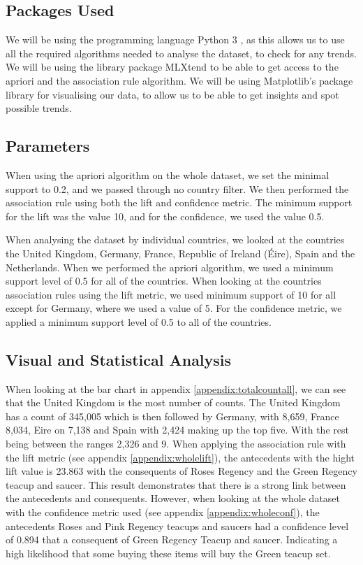 \documentclass[a4paper,10pt]{article}
\begin{document}

\subsection{Packages Used}

We will be using the programming language Python 3 \cite{Python}, as this allows us to use all the required algorithms needed to analyse the dataset, to check for any trends. We will be using the library package MLXtend\cite{raschkas_2018_mlxtend} to be able to get access to the apriori and the association rule algorithm. We will be using Matplotlib's \cite{hunter2007matplotlib} package library for visualising our data, to allow us to be able to get insights and spot possible trends.



\subsection{Parameters}

When using the apriori algorithm on the whole dataset, we set the minimal support to 0.2, and we passed through no country filter. We then performed the association rule using both the lift and confidence metric. The minimum support for the lift was the value 10, and for the confidence, we used the value 0.5.

When analysing the dataset by individual countries, we looked at the countries the United Kingdom, Germany, France, Republic of Ireland (Éire), Spain and the Netherlands. When we performed the apriori algorithm, we used a minimum support level of 0.5 for all of the countries. When looking at the countries association rules using the lift metric, we used minimum support of 10 for all except for Germany, where we used a value of 5. For the confidence metric, we applied a minimum support level of 0.5 to all of the countries.

\subsection{Visual and Statistical Analysis}

When looking at the bar chart in appendix \ref{appendix:totalcountall}, we can see that the United Kingdom is the most number of counts. The United Kingdom has a count of 345,005 which is then followed by Germany, with 8,659, France 8,034, Eire on 7,138 and Spain with 2,424 making up the top five. With the rest being between the ranges 2,326 and 9. When applying the association rule with the lift metric (see appendix \ref{appendix:wholelift}), the antecedents with the hight lift value is 23.863 with the consequents of Roses Regency and the Green Regency teacup and saucer. This result demonstrates that there is a strong link between the antecedents and consequents. However, when looking at the whole dataset with the confidence metric used (see appendix \ref{appendix:wholeconf}), the antecedents Roses and Pink Regency teacups and saucers had a confidence level of 0.894 that a consequent of Green Regency Teacup and saucer. Indicating a high likelihood that some buying these items will buy the Green teacup set.
\end{document}
